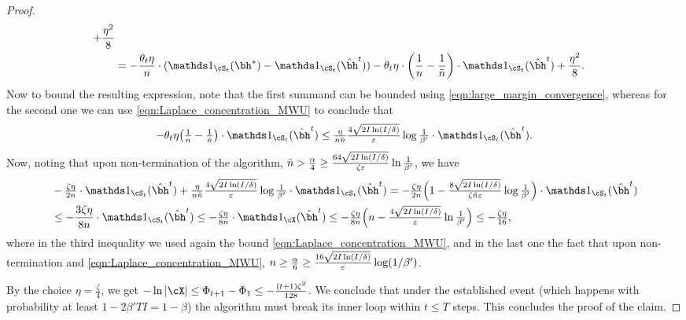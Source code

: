 \begin{proof}
\begin{align*}
+\frac{\eta^2}{8}\\
&= -\frac{\theta_t\eta}{n} \cdot ( \ind_{\cS_t}(\bh^{\ast}) - \ind_{\cS_t}(\hbh^t) ) - \theta_t\eta \cdot \left(\frac1n-\frac{1}{\tilde n}\right) \cdot \ind_{\cS_t}(\hbh^t) + \frac{\eta^2}{8}.
\end{align*}
Now to bound the resulting expression, note that the first summand can be bounded using \eqref{eqn:large_margin_convergence}, 
whereas for the second one we can use \eqref{eqn:Laplace_concentration_MWU} to conclude that
\[\textstyle - \theta_t\eta\big(\frac1n-\frac{1}{\tilde n}\big) \cdot \ind_{\cS_t}(\hbh^t) \leq \frac{\eta}{n\tilde n} \frac{4\sqrt{2I\ln(I/\delta)}}{\eps}\log \frac{1}{\beta'} \cdot \ind_{\cS_t}(\hbh^t). \]
Now, noting that upon non-termination of the algorithm, $\tilde n > \frac{\alpha}{4} \geq \frac{64\sqrt{2I\ln(I/\delta)}}{\zeta\varepsilon}\ln \frac{1}{\beta'}$, we have
\begin{align*} 
&\textstyle-\frac{\zeta\eta}{2n} \cdot \ind_{\cS_t}(\hbh^t) +\frac{\eta}{n\tilde n} \frac{4\sqrt{2I\ln(I/\delta)}}{\eps}\log \frac{1}{\beta'} \cdot \ind_{\cS_t}(\hbh^t) \textstyle = -\frac{\zeta\eta}{2n}\Big(1-\frac{8\sqrt{2I\ln(I/\delta)}}{\zeta\tilde n\eps}\log \frac{1}{\beta'} \Big) \cdot \ind_{\cS_t}(\hbh^t) \\
& \leq -\frac{3\zeta \eta}{8n} \cdot \ind_{\cS_t}(\hbh^t) \textstyle \leq -\frac{\zeta \eta}{8n} \cdot \ind_{\cX}(\hbh^t) \leq-\frac{\zeta \eta}{8n} \Big( n-\frac{4\sqrt{2I\ln(I/\delta)}}{\eps}\ln \frac{1}{\beta'} \Big) 
\leq  -\frac{\zeta \eta}{16}, 
\end{align*}
where in the third inequality we used again the bound \eqref{eqn:Laplace_concentration_MWU}, and in the last one the fact that upon non-termination and \eqref{eqn:Laplace_concentration_MWU}, $n\geq \frac{\alpha}{6}\geq \frac{16\sqrt{2I\ln(I/\delta)}}{\varepsilon}\log(1/\beta')$. 

By the choice $\eta=\frac{\zeta}{4}$, we get $-\ln|\cX| \leq \Phi_{t+1}-\Phi_1\leq -\frac{(t+1)\zeta^2}{128}$. 
We conclude that under the established event (which happens with probability at least $1-2\beta'TI=1-\beta$) the algorithm must break its inner loop within $t\leq T$ steps. This concludes the proof of the claim. 
\end{proof}

